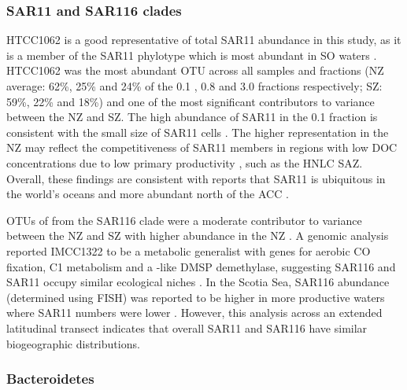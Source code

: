 \subsubsection{SAR11 and SAR116 clades}

 HTCC1062 is a good representative of total SAR11 abundance in this study, as it is a member of the SAR11 phylotype which is most abundant in \ac{SO} waters \cite{Brown:2012gna}.
 HTCC1062 was the most abundant \ac{OTU} across all samples and fractions (\ac{NZ} average: 62\%, 25\% and 24\% of the 0.1 \micron{}, 0.8 \micron{} and 3.0 \micron{} fractions respectively; \ac{SZ}: 59\%, 22\% and 18\%) and one of the most significant contributors to variance between the \ac{NZ} and \ac{SZ}.
The high abundance of SAR11 in the 0.1 \micron{} fraction is consistent with the small size of SAR11 cells \cite{Rappe:2002wz}.
The higher representation in the \ac{NZ} may reflect the competitiveness of SAR11 members in regions with low \ac{DOC} concentrations due to low primary productivity \cite{Giovannoni:2005ib,Alonso:2006dj}, such as the \ac{HNLC} \ac{SAZ}.
Overall, these findings are consistent with reports that SAR11 is ubiquitous in the world's oceans \cite{Mary:2006wk,Carlson:2009cc} and more abundant north of the \ac{ACC} \cite{Giebel:2009hr}.

\acp{OTU} of  from the SAR116 clade were a moderate contributor to variance between the \ac{NZ} and \ac{SZ} with higher abundance in the \ac{NZ} .
A genomic analysis reported  IMCC1322 to be a metabolic generalist with genes for aerobic CO fixation, C1 metabolism and a -like \ac{DMSP} demethylase, suggesting SAR116 and SAR11 occupy similar ecological niches \cite{Oh:2010di}.
In the Scotia Sea, SAR116 abundance (determined using \ac{FISH}) was reported to be higher in more productive waters where SAR11 numbers were lower \cite{Topping:2006ul}.
However, this analysis across an extended latitudinal transect indicates that overall SAR11 and SAR116 have similar biogeographic distributions.

\subsubsection{Bacteroidetes}

